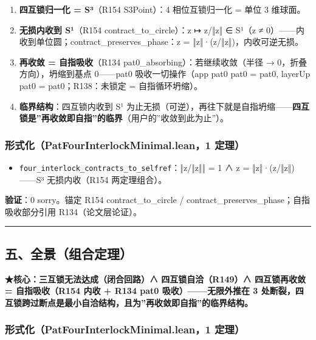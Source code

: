 \documentclass[
]{article}
\providecommand{\tightlist}{%
 \setlength{\itemsep}{0pt}\setlength{\parskip}{0pt}}
\begin{document}
\begin{enumerate}
\def\labelenumi{\arabic{enumi}.}
\tightlist
\item
 \textbf{四互锁归一化 = S³}（R154 S3Point）：4 相位互锁归一化 = 单位 3
 维球面。
\item
 \textbf{无损内收到 S¹}（R154 contract\_to\_circle）：z ↦ z/‖z‖ ∈ S¹（z
 ≠ 0）------内收到单位圆；contract\_preserves\_phase：z =
 ‖z‖·(z/‖z‖)，内收可逆无损。
\item
 \textbf{再收敛 = 自指吸收}（R134 pat0\_absorbing）：若继续收敛（半径 →
 0，折叠方向），坍缩到基点 0------pat0 吸收一切操作（app pat0 pat0 =
 pat0, layerUp pat0 = pat0；R138：未锁定 = 自指循环坍缩）。
\item
 \textbf{临界结构}：四互锁内收到 S¹
 为止无损（可逆），再往下就是自指坍缩------\textbf{四互锁是''再收敛即自指''的临界}（用户的''收敛到此为止''）。
\end{enumerate}

\subsubsection{形式化（PatFourInterlockMinimal.lean，1
定理）}\label{ux5f62ux5f0fux5316patfourinterlockminimal.lean1-ux5b9aux7406-1}

\begin{itemize}
\tightlist
\item
 \texttt{four\_interlock\_contracts\_to\_selfref}：‖z/‖z‖‖ = 1 ∧ z =
 ‖z‖·(z/‖z‖)------S³ 无损内收（R154 两定理组合）。
\end{itemize}

\textbf{验证}：0 sorry。锚定 R154 contract\_to\_circle /
contract\_preserves\_phase；自指吸收部分引用 R134（论文层论证）。

\begin{center}\rule{0.5\linewidth}{0.5pt}\end{center}

\subsection{五、全景（组合定理）}\label{ux4e94ux5168ux666fux7ec4ux5408ux5b9aux7406}

\textbf{★核心：三互锁无法达成（闭合回路）∧ 四互锁自洽（R149）∧
四互锁再收敛 = 自指吸收（R154 内收 + R134 pat0 吸收）------无限外推在 3
处断裂，四互锁跨过断点是最小自洽结构，且为''再收敛即自指''的临界结构。}

\subsubsection{形式化（PatFourInterlockMinimal.lean，1
定理）}\label{ux5f62ux5f0fux5316patfourinterlockminimal.lean1-ux5b9aux7406-2}
\end{document}
